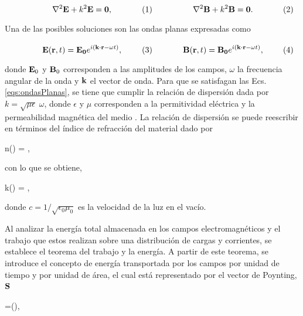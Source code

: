 	\begin{subequations}%
	\eqhalf{\nabla^2\vb{E} + k^2 \vb{E}=\vb{0},}%
	\eqhalf{\nabla^2\vb{B} + k^2 \vb{B}=\vb{0}.}\label{eq:Helmholtz}%
	\end{subequations}\vspace*{-1em}

\noindent Una de las posibles soluciones son las ondas planas expresadas como 

	\begin{subequations}%
	\eqhalf{\vb{E}(\vb{r},t) =\vb{E_0}e^{i(\vb{k}\cdot\vb{r} -\omega t)},}%
	\eqhalf{\vb{B}(\vb{r}, t) =\vb{B_0}e^{i(\vb{k}\cdot\vb{r} -\omega t)},}	
	\label{eqs:ondasPlanas}\end{subequations}\vspace*{-1em}
		
\noindent donde $\vb{E}_0$ y $\vb{B}_0$ corresponden a las amplitudes de los campos, $\omega$ la frecuencia angular de la onda y $\vb{k}$ el vector de onda. Para que se satisfagan las Ecs. \eqref{eqs:ondasPlanas}, se tiene que cumplir la relación de dispersión dada por $k=\sqrt{\mu\epsilon}\;\omega$, donde $\epsilon$ y $\mu$ corresponden a la permitividad eléctrica y la permeabilidad magnética del medio \cite{jacksonClassicalElectrodynamics2021}. La relación de dispersión se puede reescribir en términos del índice de refracción del material dado por
%
\begin{tcolorbox}
	n(\omega) = ,
	\label{eq:indice} 
\end{tcolorbox}
%	
\noindent con lo que se obtiene,
%
\begin{tcolorbox}
	k(\omega) = ,
	\label{eq:vector_onda} 
\end{tcolorbox}

\noindent donde $c=1/\sqrt{\epsilon_0\mu_0}$ es la velocidad de la luz en el vacío.

Al analizar la energía total almacenada en los campos electromagnéticos y el trabajo que estos realizan sobre una distribución de cargas y corrientes, se establece el teorema del trabajo y la energía. A partir de este teorema, se introduce el concepto de energía transportada por los campos por unidad de tiempo y por unidad de área, el cual está representado por el vector de Poynting, $\vb{S}$ \cite{griffithsIntroductionElectrodynamics2023}

\begin{tcolorbox}
	=(\times{}),
	\label{eq:vect_Poynting} 
\end{tcolorbox}

